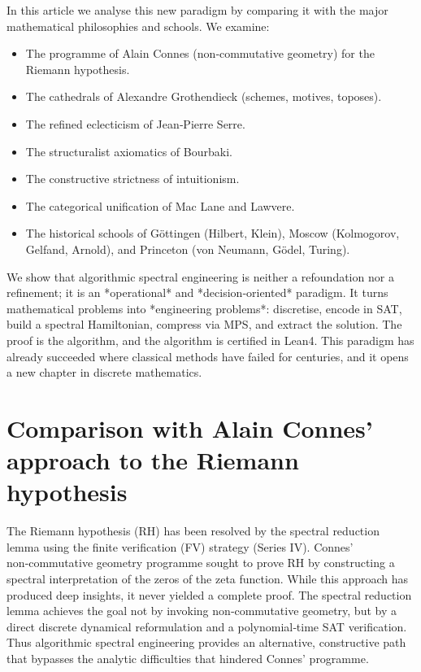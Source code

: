 \documentclass[11pt,a4paper]{article}
\begin{document}
In this article we analyse this new paradigm by comparing it with the major mathematical philosophies and schools. We examine:

\begin{itemize}
\item The programme of Alain Connes (non‑commutative geometry) for the Riemann hypothesis.
\item The cathedrals of Alexandre Grothendieck (schemes, motives, toposes).
\item The refined eclecticism of Jean‑Pierre Serre.
\item The structuralist axiomatics of Bourbaki.
\item The constructive strictness of intuitionism.
\item The categorical unification of Mac Lane and Lawvere.
\item The historical schools of Göttingen (Hilbert, Klein), Moscow (Kolmogorov, Gelfand, Arnold), and Princeton (von Neumann, Gödel, Turing).
\end{itemize}

We show that algorithmic spectral engineering is neither a refoundation nor a refinement; it is an *operational* and *decision‑oriented* paradigm. It turns mathematical problems into *engineering problems*: discretise, encode in SAT, build a spectral Hamiltonian, compress via MPS, and extract the solution. The proof is the algorithm, and the algorithm is certified in Lean4. This paradigm has already succeeded where classical methods have failed for centuries, and it opens a new chapter in discrete mathematics.

\section{Comparison with Alain Connes' approach to the Riemann hypothesis}

The Riemann hypothesis (RH) has been resolved by the spectral reduction lemma using the finite verification (FV) strategy (Series IV). Connes' non‑commutative geometry programme sought to prove RH by constructing a spectral interpretation of the zeros of the zeta function. While this approach has produced deep insights, it never yielded a complete proof. The spectral reduction lemma achieves the goal not by invoking non‑commutative geometry, but by a direct discrete dynamical reformulation and a polynomial‑time SAT verification. Thus algorithmic spectral engineering provides an alternative, constructive path that bypasses the analytic difficulties that hindered Connes' programme.
\end{document}
